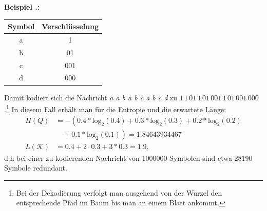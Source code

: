 \documentclass[a4paper,12pt]{article}
\newcounter{Beispiel}
\newenvironment{Beispiel}{
\medskip
        
        \setlength{\parindent}{0pt}
        \addtocounter{Beispiel}{1}
        \textbf{\textsf{Beispiel \thesubsection.\theBeispiel}:}\\}{
        \nopagebreak
        \vspace{-1.0ex}
        \bigskip
        
}
\begin{document}
\begin{Beispiel}
\begin{minipage}[h]{.5\textwidth}
\begin{tabular}{c|c}
Symbol & Verschlüsselung
\\
\hline
a & 1
\\
\hline
b & 01
\\
\hline
c & 001
\\
\hline
d & 000
\end{tabular}
\vspace{3cm}
\end{minipage}
\hfill
 \begin{minipage}[h]{.5\textwidth}
\begin{flushright}
\end{flushright}
\hspace{1.5cm} 
\end{minipage} 
Damit kodiert sich die Nachricht {\it a 	a 	b 	a 	b 	c 	a 	b 	c 	d} zu
$1\, 	1\, 	01\, 	1\, 	01\, 	001\, 	1\, 	01\, 	001\, 	000$.\footnote{\footnotesize{Bei der Dekodierung verfolgt man ausgehend von der Wurzel den entsprechende Pfad im Baum bis man an einem Blatt ankommt.}}   
In diesem Fall erhält man für die Entropie und die erwartete Länge:
\begin{align*}
H(Q) &=-\left(  0.4 * \text{log}_{2}(0.4)   +   0.3 * \text{log}_{2}(0.3) +  0.2 * \text{log}_{2}(0.2)\right.\\
     &\left.\quad +  0.1 * \text{log}_{2}(0.1)\right) = 1.84643934467
\\
L(\mathcal{K})&= 0.4 + 2\cdot 0.3 + 3* 0.3 = 1.9,
\end{align*}
d.h bei einer zu kodierenden Nachricht von 1000000 Symbolen sind etwa 28190 Symbole redundant.
\end{Beispiel}
\end{document}
